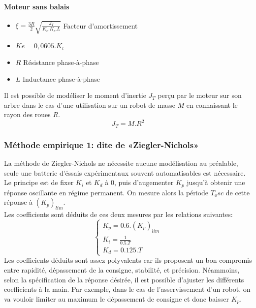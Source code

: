             \paragraph{Moteur sans balais}{
                \begin{itemize}
                    \item $\xi = \frac{3R}{2}\sqrt{\frac{J_T}{K_e.K_c.L}}$ Facteur d'amortissement
                    \item $Ke = 0,0605.K_t$
                    \item $R$ Résistance phase-à-phase
                    \item $L$ Inductance phase-à-phase\\
                \end{itemize}
            }
            Il est possible de modéliser le moment d'inertie $J_T$ perçu par le moteur sur son arbre dans le cas d'une utilisation sur un robot de masse $M$ en connaissant le rayon des roues $R$.
            \begin{equation}
                J_T = M.R^2
            \end{equation}

            \newpage
            \subsubsection{Méthode empirique 1: dite de «Ziegler-Nichols»}
                La méthode de Ziegler-Nichols ne nécessite aucune modélisation au préalable, seule une batterie d'éssais expérimentaux souvent automatisables est nécessaire.\\
                Le principe est de fixer $K_i$ et $K_d$ à 0, puis d'augementer $K_p$ jusqu'à obtenir une réponse oscillante en régime permanent. On mesure alors la période $T_osc$ de cette réponse à $(K_p)_{lim}$.\\
                Les coefficients sont déduits de ces deux mesures par les relations suivantes:
                \begin{equation}
                \begin{cases}
                    K_p = 0.6 . (K_p)_{lim}\\
                    K_i = \frac{1}{0.5 . T}\\
                    K_d = 0.125 . T
                \end{cases}
                \end{equation}
                Les coefficients déduits sont assez polyvalents car ils proposent un bon compromis entre rapidité, dépassement de la consigne, stabilité, et précision. Néammoins, selon la spécification de la réponse désirée, il est possible d'ajuster les différents coefficients à la main. Par exemple, dans le cas de l'asservissement d'un robot, on va vouloir limiter au maximum le dépassement de consigne et donc baisser $K_p$.

